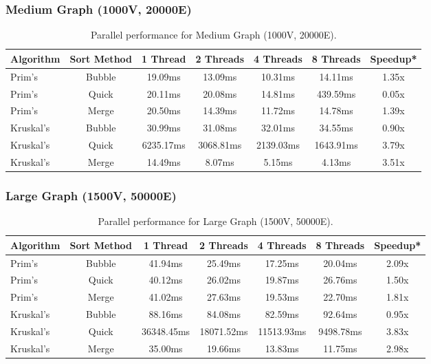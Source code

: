 \documentclass[11pt]{article}
\begin{document}
\subsubsection*{Medium Graph (1000V, 20000E)}
\begin{table}[H]
    \centering
    \begin{tabular}{lcccccc}
        \toprule
        \textbf{Algorithm} & \textbf{Sort Method} & \textbf{1 Thread} & \textbf{2 Threads} & \textbf{4 Threads} & \textbf{8 Threads} & \textbf{Speedup*} \\
        \midrule
        Prim's    & Bubble & 19.09ms  & 13.09ms & 10.31ms & 14.11ms & 1.35x \\
        Prim's    & Quick  & 20.11ms  & 20.08ms & 14.81ms & 439.59ms& 0.05x \\
        Prim's    & Merge  & 20.50ms  & 14.39ms & 11.72ms & 14.78ms & 1.39x \\
        \midrule
        Kruskal's & Bubble & 30.99ms  & 31.08ms & 32.01ms & 34.55ms & 0.90x \\
        Kruskal's & Quick  & 6235.17ms& 3068.81ms& 2139.03ms& 1643.91ms& 3.79x \\
        Kruskal's & Merge  & 14.49ms  & 8.07ms  & 5.15ms  & 4.13ms  & 3.51x \\
        \bottomrule
    \end{tabular}
    \caption{Parallel performance for Medium Graph (1000V, 20000E).}
    \label{tab:medium_parallel}
\end{table}

\subsubsection*{Large Graph (1500V, 50000E)}
\begin{table}[H]
    \centering
    \begin{tabular}{lcccccc}
        \toprule
        \textbf{Algorithm} & \textbf{Sort Method} & \textbf{1 Thread} & \textbf{2 Threads} & \textbf{4 Threads} & \textbf{8 Threads} & \textbf{Speedup*} \\
        \midrule
        Prim's    & Bubble & 41.94ms  & 25.49ms & 17.25ms & 20.04ms & 2.09x \\
        Prim's    & Quick  & 40.12ms  & 26.02ms & 19.87ms & 26.76ms & 1.50x \\
        Prim's    & Merge  & 41.02ms  & 27.63ms & 19.53ms & 22.70ms & 1.81x \\
        \midrule
        Kruskal's & Bubble & 88.16ms  & 84.08ms & 82.59ms & 92.64ms & 0.95x \\
        Kruskal's & Quick  & 36348.45ms& 18071.52ms& 11513.93ms& 9498.78ms& 3.83x \\
        Kruskal's & Merge  & 35.00ms  & 19.66ms & 13.83ms & 11.75ms & 2.98x \\
        \bottomrule
    \end{tabular}
    \caption{Parallel performance for Large Graph (1500V, 50000E).}
    \label{tab:large_parallel}
\end{table}
\end{document}
